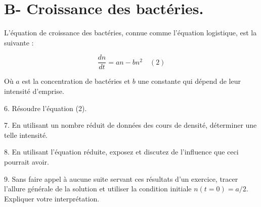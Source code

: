 \documentclass{article}
\begin{document}
\section*{B- Croissance des bactéries.}

L'équation de croissance des bactéries, connue comme l'équation logistique, est la suivante :

\begin{equation}
\frac{dn}{dt} = an - bn^2 \quad (2)
\end{equation}

Où \(a\) est la concentration de bactéries et \(b\) une constante qui dépend de leur intensité d'emprise.

6. Résoudre l'équation (2).

7. En utilisant un nombre réduit de données des cours de densité, déterminer une telle intensité.

8. En utilisant l'équation réduite, exposez et discutez de l'influence que ceci pourrait avoir.

9. Sans faire appel à aucune suite servant ces résultats d'un exercice, tracer l'allure générale de la solution et utiliser la condition initiale \(n(t=0) = a/2\). Expliquer votre interprétation.
\end{document}
